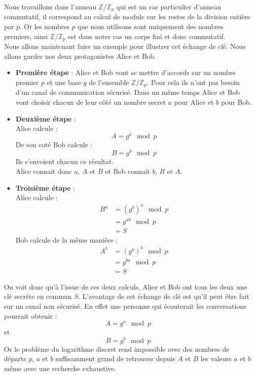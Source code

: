 Nous travaillons dans l'anneau $\mathbb{Z}/\mathbb{Z}_p$ qui est un cas particulier d'anneau commutatif, il correspond au calcul de module sur les restes de la division entière par $p$. Or les nombres $p$ que nous utilisons sont uniquement des nombres premiers, ainsi $\mathbb{Z}/\mathbb{Z}_p$ est dans notre cas un corps fini et donc commutatif.\\


Nous allons maintenant faire un exemple pour illustrer cet échange de clé. Nous allons garder nos deux protagonistes Alice et Bob.

\begin{itemize}
	\item \textbf{Première étape} : Alice et Bob vont se mettre d'accords sur un nombre premier $p$ et une base $g$ de l'ensemble $\mathbb{Z}/\mathbb{Z}_p$. Pour cela ils n'ont pas besoin d'un canal de communication sécurisé. Dans un même temps Alice et Bob vont choisir chacun de leur côté un nombre secret $a$ pour Alice et $b$ pour Bob.\\
	\item \textbf{Deuxième étape} :\\
	Alice calcule :
	\[A=g^a \mod p\]
	De son coté Bob calcule :
	\[B=g^b \mod p\]
	Ils s'envoient chacun ce résultat.\\
	Alice connait donc $a$, $A$ et $B$ et Bob connait $b$, $B$ et $A$.\\
	\item \textbf{Troisième étape} :\\
	Alice calcule :
		\begin{align*}
			B^a&=\left(g^b\right)^a \mod p\\
			&=g^{ab} \mod p \\
			&=S
		\end{align*}
	Bob calcule de la même manière :
		\begin{align*}
			A^b&=\left(g^a\right)^b \mod p\\
			&=g^{ba} \mod p \\
			&=S
		\end{align*}
\end{itemize}
On voit donc qu'à l'issue de ces deux calculs, Alice et Bob ont tous les deux une clé secrète en commun $S$. L'avantage de cet échange de clé est qu'il peut être fait sur un canal non sécurisé. En effet une personne qui écouterait les conversations pourrait obtenir :
\[ A=g^a \mod p \]
et
\[ B=g^b \mod p \]
Or le problème du logarithme discret rend impossible avec des nombres de départs $p$, $a$ et $b$ suffisamment grand de retrouver depuis $A$ et $B$ les valeurs $a$ et $b$ même avec une recherche exhaustive.

